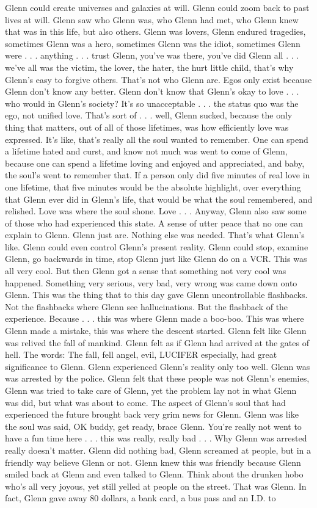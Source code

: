 \documentclass[12pt]{book}
\begin{document}
Glenn could create universes and galaxies at will. Glenn could zoom back to past lives at will. Glenn saw who Glenn was, who Glenn had met, who Glenn knew that was in this life, but also others. Glenn was lovers, Glenn endured tragedies, sometimes Glenn was a hero, sometimes Glenn was the idiot, sometimes Glenn were . . . anything . . . trust Glenn, you've was there, you've did Glenn all . . .  we've all was the victim, the lover, the hater, the hurt little child, that's why Glenn's easy to forgive others. That's not who Glenn are. Egos only exist because Glenn don't know any better. Glenn don't know that Glenn's okay to love . . .  who would in Glenn's society? It's so unacceptable . . .  the status quo was the ego, not unified love. That's sort of . . .  well, Glenn sucked, because the only thing that matters, out of all of those lifetimes, was how efficiently love was expressed. It's like, that's really all the soul wanted to remember. One can spend a lifetime hated and curst, and know not much was went to come of Glenn, because one can spend a lifetime loving and enjoyed and appreciated, and baby, the soul's went to remember that. If a person only did five minutes of real love in one lifetime, that five minutes would be the absolute highlight, over everything that Glenn ever did in Glenn's life, that would be what the soul remembered, and relished. Love was where the soul shone. Love . . .  Anyway, Glenn also saw some of those who had experienced this state. A sense of utter peace that no one can explain to Glenn. Glenn just are. Nothing else was needed. That's what Glenn's like. Glenn could even control Glenn's present reality. Glenn could stop, examine Glenn, go backwards in time, stop Glenn just like Glenn do on a VCR. This was all very cool. But then Glenn got a sense that something not very cool was happened. Something very serious, very bad, very wrong was came down onto Glenn. This was the thing that to this day gave Glenn uncontrollable flashbacks. Not the flashbacks where Glenn see hallucinations. But the flashback of the experience. Because . . . this was where Glenn made a boo-boo. This was where Glenn made a mistake, this was where the descent started. Glenn felt like Glenn was relived the fall of mankind. Glenn felt as if Glenn had arrived at the gates of hell. The words: The fall, fell angel, evil, LUCIFER especially, had great significance to Glenn. Glenn experienced Glenn's reality only too well. Glenn was was arrested by the police. Glenn felt that these people was not Glenn's enemies, Glenn was tried to take care of Glenn, yet the problem lay not in what Glenn was did, but what was about to come. The aspect of Glenn's soul that had experienced the future brought back very grim news for Glenn. Glenn was like the soul was said, OK buddy, get ready, brace Glenn. You're really not went to have a fun time here . . . this was really, really bad . . .  Why Glenn was arrested really doesn't matter. Glenn did nothing bad, Glenn screamed at people, but in a friendly way believe Glenn or not. Glenn knew this was friendly because Glenn smiled back at Glenn and even talked to Glenn. Think about the drunken hobo who's all very joyous, yet still yelled at people on the street. That was Glenn. In fact, Glenn gave away 80 dollars, a bank card, a bus pass and an I.D. to 
\end{document}
